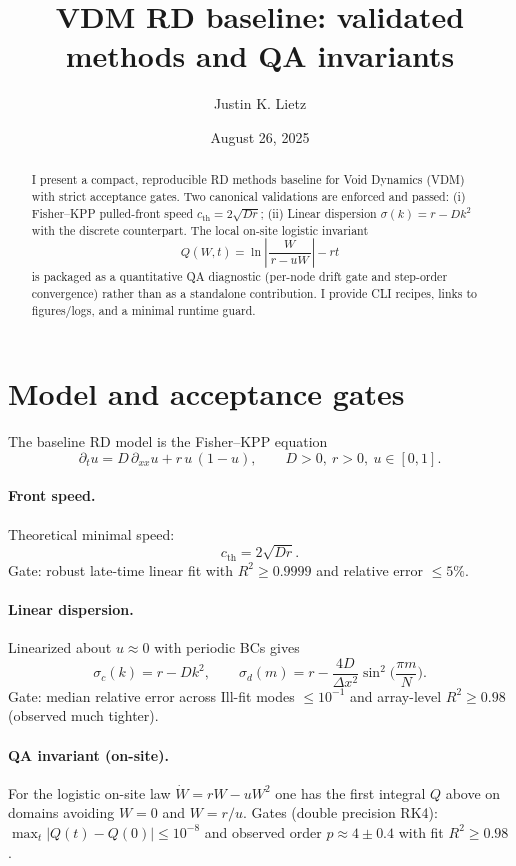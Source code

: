 \documentclass[11pt]{article}
\title{VDM RD baseline: validated methods and QA invariants}
\author{Justin K. Lietz}
\date{August 26, 2025}
\begin{document}
\maketitle

\begin{abstract}
I present a compact, reproducible RD methods baseline for Void Dynamics (VDM) with strict acceptance gates. Two canonical validations are enforced and passed: (i) Fisher--KPP pulled-front speed $c_{\mathrm{th}}=2\sqrt{Dr}$; (ii) Linear dispersion $\sigma(k)=r-Dk^2$ with the discrete counterpart. The local on-site logistic invariant
\[
Q(W,t) = \ln\!\left|\frac{W}{\,r-uW\,}\right| - r t
\]
is packaged as a quantitative QA diagnostic (per-node drift gate and step-order convergence) rather than as a standalone contribution. I provide CLI recipes, links to figures/logs, and a minimal runtime guard.
\end{abstract}

\section{Model and acceptance gates}
The baseline RD model is the Fisher--KPP equation
\begin{equation}
\partial_t u = D\,\partial_{xx} u + r\,u\,(1-u),
\qquad D>0,\ r>0,\ u\in[0,1].
\end{equation}

\paragraph{Front speed.} Theoretical minimal speed:
\begin{equation}
c_{\mathrm{th}} = 2\sqrt{D r}.
\end{equation}
Gate: robust late-time linear fit with $R^2 \ge 0.9999$ and relative error $\le 5\%$.

\paragraph{Linear dispersion.} Linearized about $u\approx 0$ with periodic BCs gives
\begin{equation}
\sigma_c(k) = r - D k^2,\qquad
\sigma_d(m) = r - \frac{4D}{\Delta x^2}\sin^2\!\Big(\frac{\pi m}{N}\Big).
\end{equation}
Gate: median relative error across Ill-fit modes $\le 10^{-1}$ and array-level $R^2 \ge 0.98$ (observed much tighter).

\paragraph{QA invariant (on-site).} For the logistic on-site law $\dot W = rW - uW^2$ one has the first integral $Q$ above on domains avoiding $W=0$ and $W=r/u$. Gates (double precision RK4): $\max_t|Q(t)-Q(0)| \le 10^{-8}$ and observed order $p\approx 4\pm 0.4$ with fit $R^2\ge 0.98$.
\end{document}
